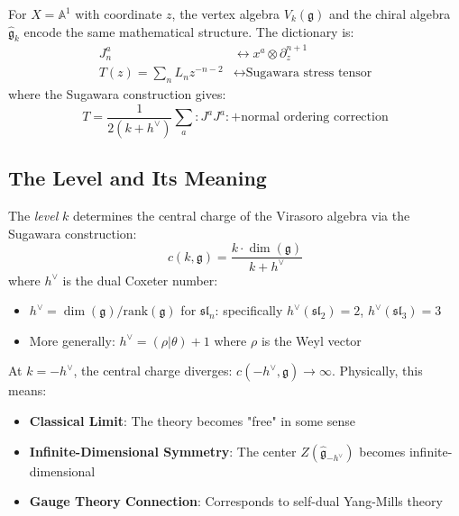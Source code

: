 \begin{theorem}\label{thm:vertex-chiral-equivalence}
For $X = \mathbb{A}^1$ with coordinate $z$, the vertex algebra $V_k(\mathfrak{g})$ and the chiral algebra $\widehat{\mathfrak{g}}_k$ encode the same mathematical structure. The dictionary is:
\begin{align}
J^a_n &\longleftrightarrow x^a \otimes \partial_z^{n+1} \\
T(z) = \sum_n L_n z^{-n-2} &\longleftrightarrow \text{Sugawara stress tensor}
\end{align}
where the Sugawara construction gives:
\begin{equation}
T = \frac{1}{2(k+h^\vee)} \sum_a :J^a J^a: + \text{normal ordering correction}
\end{equation}
\end{theorem}

\subsection{The Level and Its Meaning}

\begin{definition}
The \emph{level} $k$ determines the central charge of the Virasoro algebra via the Sugawara construction:
\begin{equation}
c(k, \mathfrak{g}) = \frac{k \cdot \dim(\mathfrak{g})}{k + h^\vee}
\end{equation}
where $h^\vee$ is the dual Coxeter number:
\begin{itemize}
\item $h^\vee = \dim(\mathfrak{g}) / \mathrm{rank}(\mathfrak{g})$ for $\mathfrak{sl}_n$: specifically $h^\vee(\mathfrak{sl}_2) = 2$, $h^\vee(\mathfrak{sl}_3) = 3$
\item More generally: $h^\vee = (\rho|\theta) + 1$ where $\rho$ is the Weyl vector
\end{itemize}
\end{definition}

\begin{principle}
At $k = -h^\vee$, the central charge diverges: $c(-h^\vee, \mathfrak{g}) \to \infty$. Physically, this means:
\begin{itemize}
\item \textbf{Classical Limit}: The theory becomes "free" in some sense
\item \textbf{Infinite-Dimensional Symmetry}: The center $Z(\widehat{\mathfrak{g}}_{-h^\vee})$ becomes infinite-dimensional
\item \textbf{Gauge Theory Connection}: Corresponds to self-dual Yang-Mills theory
\end{itemize}
\end{principle}


